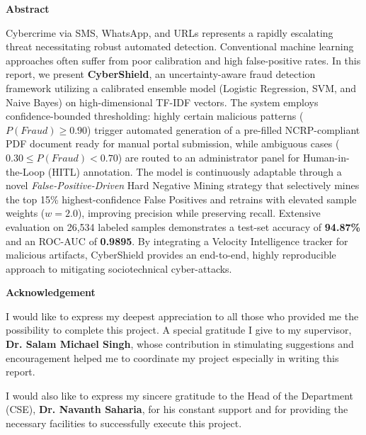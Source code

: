 \documentclass[a4paper, 11pt, oneside]{report}
\begin{document}
\newpage
{}
\begin{center}
    { \LARGE \textbf{Abstract}}
\end{center}
\vspace{2cm}
{\large
Cybercrime via SMS, WhatsApp, and URLs represents a rapidly escalating threat necessitating robust automated detection. Conventional machine learning approaches often suffer from poor calibration and high false-positive rates. In this report, we present \textbf{CyberShield}, an uncertainty-aware fraud detection framework utilizing a calibrated ensemble model (Logistic Regression, SVM, and Naive Bayes) on high-dimensional TF-IDF vectors. The system employs confidence-bounded thresholding: highly certain malicious patterns \linebreak ($P(Fraud) \geq 0.90$) trigger automated generation of a pre-filled NCRP-compliant PDF document ready for manual portal submission, while ambiguous cases \linebreak ($0.30 \leq P(Fraud) < 0.70$) are routed to an administrator panel for Human-in-the-Loop (HITL) annotation. The model is continuously adaptable through a novel \textit{False-Positive-Driven} Hard Negative Mining strategy that selectively mines the top 15\% highest-confidence False Positives and retrains with elevated sample weights ($w=2.0$), improving precision while preserving recall. Extensive evaluation on 26,534 labeled samples demonstrates a test-set accuracy of \textbf{94.87\%} and an ROC-AUC of \textbf{0.9895}. By integrating a Velocity Intelligence tracker for malicious artifacts, CyberShield provides an end-to-end, highly reproducible approach to mitigating sociotechnical cyber-attacks.
}

\newpage
        \begin{center}
            { \LARGE \textbf{Acknowledgement}}
        \end{center}
	\vspace{2cm}
	I would like to express my deepest appreciation to all those who provided me the possibility to complete this project. A special gratitude I give to my supervisor, \textbf{Dr. Salam Michael Singh}, whose contribution in stimulating suggestions and encouragement helped me to coordinate my project especially in writing this report.

	I would also like to express my sincere gratitude to the Head of the Department (CSE), \textbf{Dr. Navanth Saharia}, for his constant support and for providing the necessary facilities to successfully execute this project.
	
\end{document}
